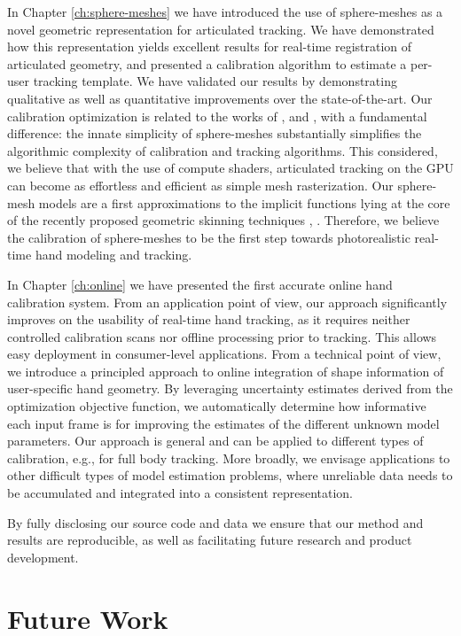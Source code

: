 In Chapter \ref{ch:sphere-meshes} we have introduced the use of sphere-meshes as a novel geometric representation for articulated tracking. We have demonstrated how this representation yields excellent results for real-time registration of articulated geometry, and presented a calibration algorithm to estimate a per-user tracking template. We have validated our results by demonstrating qualitative as well as quantitative improvements over the state-of-the-art. Our calibration optimization is related to the works of \cite{taylor2014user},  \cite{khamis15learning} and  \cite{joseph2016fits}, with a fundamental difference: the innate simplicity of sphere-meshes substantially simplifies the algorithmic complexity of calibration and tracking algorithms. This considered, we believe that with the use of compute shaders, articulated tracking on the GPU can become as effortless and efficient as simple mesh rasterization. 
Our sphere-mesh models are a first approximations to the implicit functions lying at the core of the recently proposed geometric skinning techniques \cite{vaillant2013implicit},  \cite{vaillant2014robust}. Therefore, we believe the calibration of sphere-meshes to be the first step towards photorealistic real-time hand modeling and tracking.

In Chapter \ref{ch:online} we have presented the first accurate online hand calibration system. 
From an application point of view, our approach significantly improves on the usability of real-time hand tracking, as it requires neither controlled calibration scans nor offline processing prior to tracking. This allows easy deployment in consumer-level applications. From a technical point of view, we introduce a principled approach to online integration of shape information of user-specific hand geometry. By leveraging uncertainty estimates derived from the optimization objective function, we automatically determine how informative each input frame is for improving the estimates of the different unknown model parameters. Our approach is general and can be applied to different types of calibration, e.g., for full body tracking. More broadly, we envisage applications to other difficult types of model estimation problems, where unreliable data needs to be accumulated and integrated into a consistent representation.

By fully disclosing our source code and data we ensure that our method and results are reproducible, as well as facilitating future research and product development. 

\section {Future Work}





%
%


